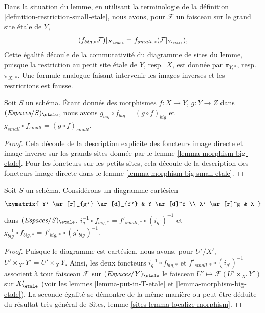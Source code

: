 \noindent
Dans la situation du lemme, en utilisant la terminologie de
la définition \ref{definition-restriction-small-etale},
nous avons, pour $\mathcal{F}$ un faisceau sur le grand site \'etale de $Y$,
$$
(f_{big, *}\mathcal{F})|_{X_\etale} =
f_{small, *}(\mathcal{F}|_{Y_\etale}),
$$
Cette égalité découle de la commutativité du diagramme de
sites du lemme, puisque la restriction au petit site \'etale de
$Y$, resp.\ $X$, est donnée par $\pi_{Y, *}$, resp.\ $\pi_{X, *}$.
Une formule analogue faisant intervenir les images inverses et les restrictions est fausse.

\begin{lemma}
\label{lemma-composition-etale}
Soit $S$ un schéma. Étant donnés des morphismes $f : X \to Y$, $g : Y \to Z$
dans $(\textit{Espaces}/S)_\etale$, nous avons
$g_{big} \circ f_{big} = (g \circ f)_{big}$ et
$g_{small} \circ f_{small} = (g \circ f)_{small}$.
\end{lemma}

\begin{proof}
Cela découle de la description explicite des foncteurs image directe
et image inverse sur les grands sites donnée par le
lemme \ref{lemma-morphism-big-etale}. Pour les foncteurs
sur les petits sites, cela découle de la description des
foncteurs image directe dans le lemme \ref{lemma-morphism-big-small-etale}.
\end{proof}

\begin{lemma}
\label{lemma-morphism-big-small-cartesian-diagram-etale}
Soit $S$ un schéma. Considérons un diagramme cartésien
$$
\xymatrix{
Y' \ar[r]_{g'} \ar[d]_{f'} & Y \ar[d]^f \\
X' \ar[r]^g & X
}
$$
dans $(\textit{Espaces}/S)_\etale$.
$i_g^{-1} \circ f_{big, *} = f'_{small, *} \circ (i_{g'})^{-1}$
et $g_{big}^{-1} \circ f_{big, *} = f'_{big, *} \circ (g'_{big})^{-1}$.
\end{lemma}

\begin{proof}
Puisque le diagramme est cartésien, nous avons, pour $U'/X'$,
$U' \times_{X'} Y' = U' \times_X Y$. Ainsi, les deux foncteurs
$i_g^{-1} \circ f_{big, *}$ et $f'_{small, *} \circ (i_{g'})^{-1}$
associent à tout faisceau $\mathcal{F}$ sur $(\textit{Espaces}/Y)_\etale$ le faisceau
$U' \mapsto \mathcal{F}(U' \times_{X'} Y')$ sur $X'_\etale$
(voir les lemmes \ref{lemma-put-in-T-etale} et \ref{lemma-morphism-big-etale}).
La seconde égalité se démontre de la même manière ou peut être
déduite du résultat très général de
Sites, lemme \ref{sites-lemma-localize-morphism}.
\end{proof}

